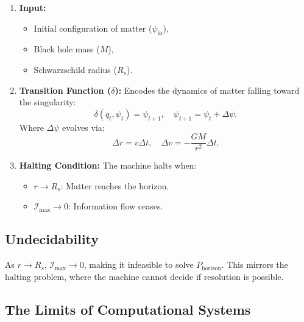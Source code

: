 \documentclass[12pt]{article}
\begin{document}
\begin{enumerate}
    \item \textbf{Input:}
    \begin{itemize}
        \item Initial configuration of matter ($\psi_{\text{in}}$),
        \item Black hole mass ($M$),
        \item Schwarzschild radius ($R_s$).
    \end{itemize}
    \item \textbf{Transition Function ($\delta$):}
    Encodes the dynamics of matter falling toward the singularity:
    \[
    \delta(q_t, \psi_t) = \psi_{t+1}, \quad \psi_{t+1} = \psi_t + \Delta \psi.
    \]
    Where $\Delta \psi$ evolves via:
    \[
    \Delta r = v \Delta t, \quad \Delta v = -\frac{GM}{r^2} \Delta t.
    \]
    \item \textbf{Halting Condition:}
    The machine halts when:
    \begin{itemize}
        \item $r \to R_s$: Matter reaches the horizon.
        \item $\mathcal{I}_{\text{max}} \to 0$: Information flow ceases.
    \end{itemize}
\end{enumerate}

\subsection{Undecidability}

As $r \to R_s$, $\mathcal{I}_{\text{max}} \to 0$, making it infeasible to solve $P_{\text{horizon}}$. This mirrors the halting problem, where the machine cannot decide if resolution is possible.

\subsection{The Limits of Computational Systems}
\end{document}
